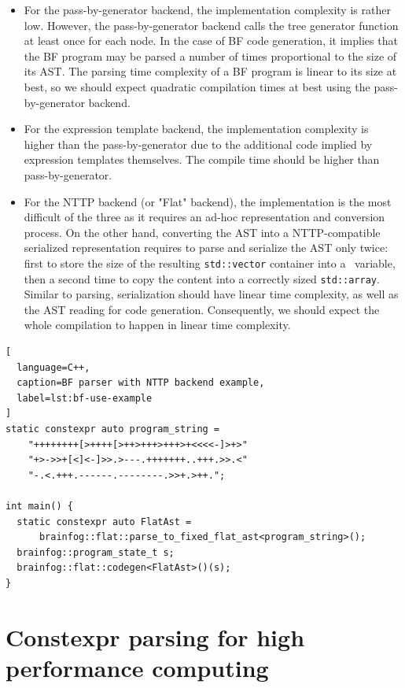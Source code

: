 \documentclass[../../main.tex]{subfiles}
\begin{document}
\begin{itemize}
\item For the pass-by-generator backend, the implementation complexity is
rather low. However, the pass-by-generator backend calls the tree
generator function at least once for each node. In the
case of BF code generation, it implies that the BF program may be parsed a
number of times proportional to the size of its AST. The parsing time complexity
of a BF program is linear to its size at best, so we should expect
quadratic compilation times at best using the pass-by-generator backend.\\

\item For the expression template backend, the implementation complexity is
higher than the pass-by-generator due to the additional code implied by expression
templates themselves. The compile time should be higher than pass-by-generator.\\

\item For the NTTP backend (or "Flat" backend), the implementation is the most
difficult of the three as it requires an ad-hoc representation and conversion
process.
On the other hand, converting the AST into a NTTP-compatible serialized
representation requires to parse and serialize the AST only twice: first to
store the size of the resulting \lstinline|std::vector| container into a
\constexpr~variable, then a second time to copy the content into a
correctly sized \lstinline|std::array|. Similar to parsing, serialization should
have linear time complexity, as well as the AST reading for code generation.
Consequently, we should expect the whole compilation to happen in linear
time complexity.
\end{itemize}

\begin{lstlisting}[
  language=C++,
  caption=BF parser with NTTP backend example,
  label=lst:bf-use-example
]
static constexpr auto program_string =
    "++++++++[>++++[>++>+++>+++>+<<<<-]>+>"
    "+>->>+[<]<-]>>.>---.+++++++..+++.>>.<"
    "-.<.+++.------.--------.>>+.>++.";

int main() {
  static constexpr auto FlatAst =
      brainfog::flat::parse_to_fixed_flat_ast<program_string>();
  brainfog::program_state_t s;
  brainfog::flat::codegen<FlatAst>()(s);
}
\end{lstlisting}

\section{Constexpr parsing for high performance computing}
\end{document}
